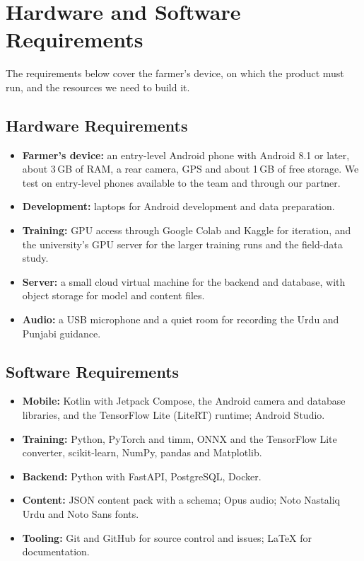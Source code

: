 \section{Hardware and Software Requirements}
\label{sec:hwsw}
The requirements below cover the farmer's device, on which the product must run, and the resources we need to build it.
\subsection{Hardware Requirements}
\begin{itemize}
  \item \textbf{Farmer's device:} an entry-level Android phone with Android 8.1 or later, about 3\,GB of RAM, a rear camera, GPS and about 1\,GB of free storage. We test on entry-level phones available to the team and through our partner.
  \item \textbf{Development:} laptops for Android development and data preparation.
  \item \textbf{Training:} GPU access through Google Colab and Kaggle for iteration, and the university's GPU server for the larger training runs and the field-data study.
  \item \textbf{Server:} a small cloud virtual machine for the backend and database, with object storage for model and content files.
  \item \textbf{Audio:} a USB microphone and a quiet room for recording the Urdu and Punjabi guidance.
\end{itemize}
\subsection{Software Requirements}
\begin{itemize}
  \item \textbf{Mobile:} Kotlin with Jetpack Compose, the Android camera and database libraries, and the TensorFlow Lite (LiteRT) runtime; Android Studio.
  \item \textbf{Training:} Python, PyTorch and timm, ONNX and the TensorFlow Lite converter, scikit-learn, NumPy, pandas and Matplotlib.
  \item \textbf{Backend:} Python with FastAPI, PostgreSQL, Docker.
  \item \textbf{Content:} JSON content pack with a schema; Opus audio; Noto Nastaliq Urdu and Noto Sans fonts.
  \item \textbf{Tooling:} Git and GitHub for source control and issues; LaTeX for documentation.
\end{itemize}

